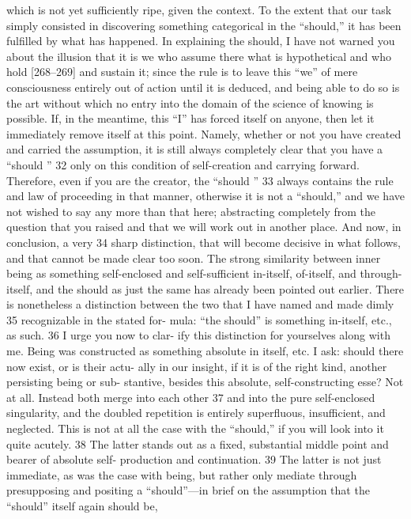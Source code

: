 which is not yet sufficiently ripe, given the context. To the extent that our task
simply consisted in discovering something categorical in the “should,” it has
been fulfilled by what has happened.
In explaining the should, I have not warned you about the illusion that
it is we who assume there what is hypothetical and who hold [268–269] and
sustain it; since the rule is to leave this “we” of mere consciousness entirely out
of action until it is deduced, and being able to do so is the art without which
no entry into the domain of the science of knowing is possible. If, in the
meantime, this “I” has forced itself on anyone, then let it immediately remove
itself at this point. Namely, whether or not you have created and carried the
assumption, it is still always completely clear that you have a “should ” 32 only
on this condition of self-creation and carrying forward. Therefore, even if you
are the creator, the “should ” 33 always contains the rule and law of proceeding
in that manner, otherwise it is not a “should,” and we have not wished to say
any more than that here; abstracting completely from the question that you
raised and that we will work out in another place.
And now, in conclusion, a very 34 sharp distinction, that will become
decisive in what follows, and that cannot be made clear too soon. The strong
similarity between inner being as something self-enclosed and self-sufficient
in-itself, of-itself, and through-itself, and the should as just the same has
already been pointed out earlier. There is nonetheless a distinction between
the two that I have named and made dimly 35 recognizable in the stated for-
mula: “the should” is something in-itself, etc., as such. 36 I urge you now to clar-
ify this distinction for yourselves along with me. Being was constructed as
something absolute in itself, etc. I ask: should there now exist, or is their actu-
ally in our insight, if it is of the right kind, another persisting being or sub-
stantive, besides this absolute, self-constructing esse? Not at all. Instead both
merge into each other 37 and into the pure self-enclosed singularity, and the
doubled repetition is entirely superfluous, insufficient, and neglected. This is
not at all the case with the “should,” if you will look into it quite acutely. 38 The
latter stands out as a fixed, substantial middle point and bearer of absolute self-
production and continuation. 39 The latter is not just immediate, as was the case
with being, but rather only mediate through presupposing and positing a
“should”—in brief on the assumption that the “should” itself again should be,
